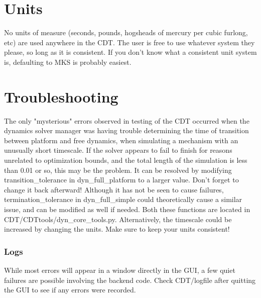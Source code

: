 \documentclass{article}
\begin{document}
\section{Units}
No units of measure (seconds, pounds, hogsheads of mercury per cubic furlong, etc) are used anywhere in the CDT. The user is free to use whatever system they please, so long as it is consistent. If you don't know what a consistent unit system is, defaulting to MKS is probably easiest.
\section{Troubleshooting}
The only "mysterious" errors observed in testing of the CDT occurred when the dynamics solver manager was having trouble determining the time of transition between platform and free dynamics, when simulating a mechanism with an unusually short timescale. If the solver appears to fail to finish for reasons unrelated to optimization bounds, and the total length of the simulation is less than 0.01 or so, this may be the problem. It can be resolved by modifying transition\_tolerance in dyn\_full\_platform to a larger value. Don't forget to change it back afterward! Although it has not be seen to cause failures, termination\_tolerance in dyn\_full\_simple could theoretically cause a similar issue, and can be modified as well if needed. Both these functions are located in CDT/CDTtools/dyn\_core\_tools.py. Alternatively, the timescale could be increased by changing the units. Make sure to keep your units consistent!
\subsubsection{Logs}
While most errors will appear in a window directly in the GUI, a few quiet failures are possible involving the backend code. Check CDT/logfile after quitting the GUI to see if any errors were recorded.
\end{document}
